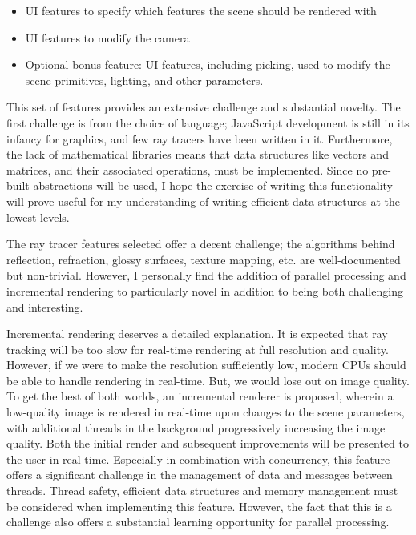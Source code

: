 \documentclass[12pt]{article}
\begin{document}
\begin{description}
	\begin{itemize}
	\item UI features to specify which features the scene should be rendered with
	\item UI features to modify the camera
	\item Optional bonus feature: UI features, including picking, used to modify 
	the scene primitives, lighting, and other parameters.
	\end{itemize}
	
	This set of features provides an extensive challenge and substantial novelty.
	The first challenge is from the choice of language; JavaScript development is
	still in its infancy for graphics, and few ray tracers have been written in it.
	Furthermore, the lack of mathematical libraries means that data structures like
	vectors and matrices, and their associated operations, must be implemented. Since
	no pre-built abstractions will be used, I hope the exercise of writing this
	functionality will prove useful for my understanding of writing efficient data
	structures at the lowest levels.
	
	The ray tracer features selected offer a decent challenge; the algorithms behind
	reflection, refraction, glossy surfaces, texture mapping, etc. are well-documented
	but non-trivial. However, I personally find the addition of parallel processing
	and incremental rendering to particularly novel in addition to being both
	challenging and interesting.
	
	Incremental rendering deserves a detailed explanation. It is expected that ray
	tracking will be too slow for real-time rendering at full resolution and quality.
	However, if we were to make the resolution sufficiently low, modern CPUs should
	be able to handle rendering in real-time. But, we would lose out on image
	quality. To get the best of both worlds, an incremental renderer is proposed, wherein
	a low-quality image is rendered in real-time upon changes to the scene parameters,
	with additional threads in the background progressively increasing the image quality.
	Both the initial render and subsequent improvements will be presented to the 
	user in real time. Especially in combination with concurrency, this feature
	offers a significant challenge in the management of data and messages between
	threads. Thread safety, efficient data structures and memory management must
	be considered when implementing this feature. However, the fact that this
	is a challenge also offers a substantial learning opportunity for
	parallel processing. 
	

\end{description}
\end{document}
